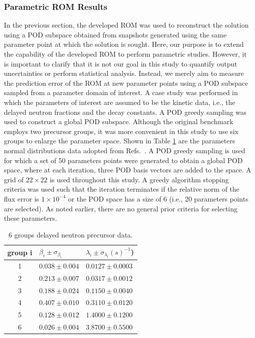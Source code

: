 \documentclass[]{interact}
\theoremstyle{plain}%
\theoremstyle{definition}
\theoremstyle{remark}
\begin{document}
\subsubsection{Parametric ROM Results}

In the previous section, the developed ROM was used to reconstruct the solution using a POD subspace obtained from snapshots generated using the same parameter point at which the solution is sought.
Here, our purpose is to extend the capability of the developed ROM to perform parametric studies.
However, it is important to clarify that it is not our goal in this study to quantify output uncertainties or perform statistical analysis.
Instead, we merely aim to measure the prediction error of the ROM at new parameter points using a POD subspace sampled from a parameter domain of interest.
A case study was performed in which the parameters of interest are assumed to be the kinetic data, i.e., the delayed neutron fractions and the decay constants. A POD greedy sampling was used to construct a global POD subspace.
Although the original benchmark employs two precursor groups, it was more convenient in this study to use six groups to enlarge the parameter space.
Shown in Table \ref{tab: 6 groups precursor data} are the parameters normal distributions data adopted from Refs.~\cite{keepin1957delayed, tuttle1975delayed}.
A POD greedy sampling is used for which a set of 50 parameters points were generated to obtain a global POD space, where at each iteration, three POD basis vectors are added to the space.
A grid of $22\times 22$ is used throughout this study.
A greedy algorithm stopping criteria was used such that the iteration terminates if the relative norm of the flux error is $1\times10^{-4}$ or the POD space has a size of 6 (i.e., 20 parameters points are selected).
As noted earlier, there are no general prior criteria for selecting these parameters.

\begin{table}[h!]
	\centering
	\begin{tabular}{c|l|l}
		group i& $\beta_i \pm \sigma_{\beta_i}$  & $\lambda_i\pm \sigma_{\lambda_i} (s)^{-1}$)  \\
		\hline
		1    &  $0.038\pm 0.004$ & $0.0127 \pm 0.0003$ \\
		2    &  $0.213 \pm 0.007$  & $0.0317 \pm 0.0012$ \\
		3    &  $0.188 \pm 0.024$ & $0.1150 \pm 0.0040$ \\
		4    &  $0.407 \pm 0.010$ & $0.3110 \pm 0.0120$ \\
		5    &  $0.128 \pm 0.012$ & $1.4000\pm0.1200$ \\
		6    &  $0.026\pm0.004$ & $3.8700\pm0.5500$ \\
	\end{tabular}
	\caption{6 groups delayed neutron precursor data.}
	\label{tab: 6 groups precursor data}
\end{table}
\end{document}
